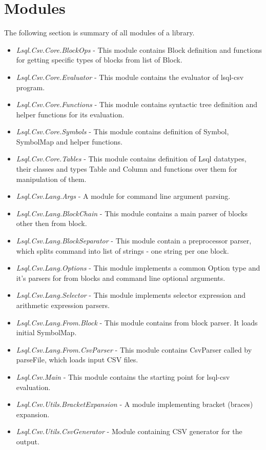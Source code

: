\section{Modules}
The following section is summary of all modules of a library.
\begin{itemize}
   \item \textit{Lsql.Csv.Core.BlockOps} - This module contains Block definition and functions for getting specific types of blocks from list of Block.
   \item \textit{Lsql.Csv.Core.Evaluator} - This module contains the evaluator of lsql-csv program.
   \item \textit{Lsql.Csv.Core.Functions} - This module contains syntactic tree definition and helper functions for its evaluation.
   \item \textit{Lsql.Csv.Core.Symbols} - This module contains definition of Symbol, SymbolMap and helper functions.
   \item \textit{Lsql.Csv.Core.Tables} - This module contains definition of Lsql datatypes, their classes and types Table and Column and functions over them for manipulation of them.
   \item \textit{Lsql.Csv.Lang.Args} - A module for command line argument parsing.
   \item \textit{Lsql.Csv.Lang.BlockChain} - This module contains a main parser of blocks other then from block.
   \item \textit{Lsql.Csv.Lang.BlockSeparator} - This module contain a preprocessor parser, which splits command into list of strings - one string per one block.
   \item \textit{Lsql.Csv.Lang.Options} - This module implements a common Option type and it's parsers for from blocks and command line optional arguments.
   \item \textit{Lsql.Csv.Lang.Selector} - This module implements selector expression and arithmetic expression parsers.
   \item \textit{Lsql.Csv.Lang.From.Block} - This module contains from block parser. It loads initial SymbolMap.
   \item \textit{Lsql.Csv.Lang.From.CsvParser} - This module contains CsvParser called by parseFile, which loads input CSV files.
   \item \textit{Lsql.Csv.Main} - This module contains the starting point for lsql-csv evaluation.
   \item \textit{Lsql.Csv.Utils.BracketExpansion} - A module implementing bracket (braces) expansion.
   \item \textit{Lsql.Csv.Utils.CsvGenerator} - Module containing CSV generator for the output.
\end{itemize}

